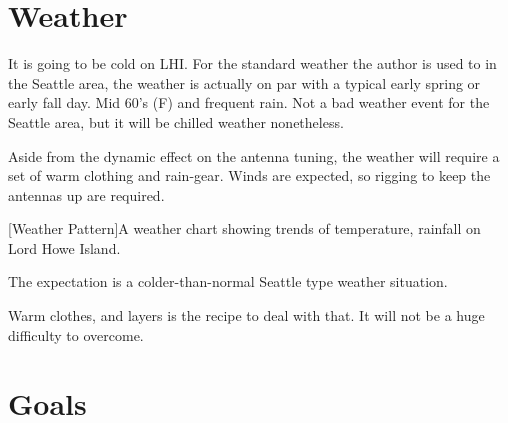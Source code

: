 \documentclass[11pt]{article}
\begin{document}
\section{Weather}

It is going to be cold on LHI.  For the standard weather
the author is used to in the Seattle area, the weather is actually
on par with a typical early spring or early fall day.  Mid 60's (F)
and frequent rain.  Not a bad weather event for the Seattle area,
but it will be chilled weather nonetheless. 
\par
Aside from the dynamic effect on the antenna tuning, the weather
will require a set of warm clothing and rain-gear.  Winds are 
expected, so rigging to keep the antennas up are required.

\vskip2mm
\noindent%
\begin{minipage}{\linewidth}%
\captionsetup{width=0.8\linewidth}
[Weather Pattern]{A weather chart showing trends of temperature,
rainfall on Lord Howe Island.}
\label{rain}
\end{minipage}
\vskip3mm

The expectation is a colder-than-normal Seattle type weather situation.
\par
Warm clothes, and layers is the recipe to deal with that.  It will not
be a huge difficulty to overcome.

\section{Goals}
\end{document}
